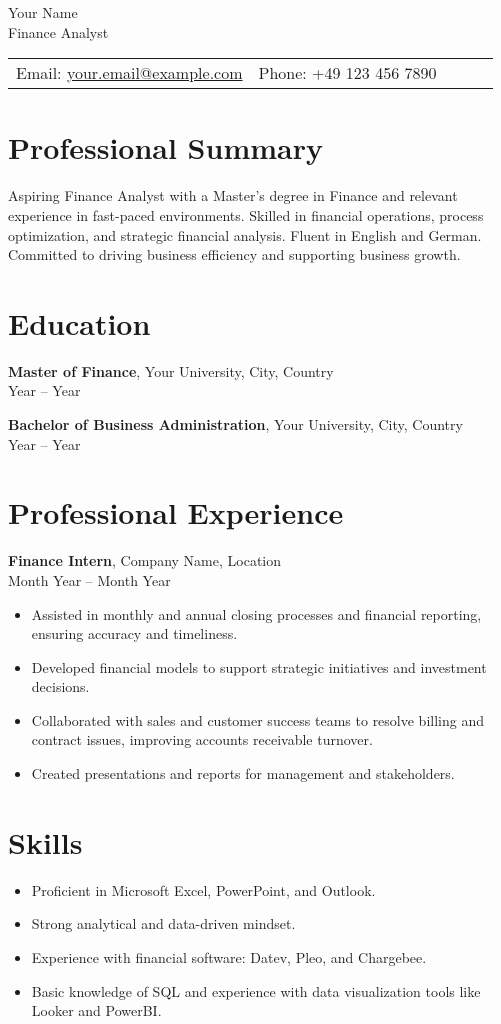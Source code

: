 \documentclass[a4paper,10pt]{article}
\newcommand{\contactinfo}[2]{
  \begin{tabular}{>{\centering\arraybackslash}m{0.5\linewidth}>{\centering\arraybackslash}m{0.5\linewidth}}
    Email: \href{mailto:#1}{#1} & Phone: #2 \\
  \end{tabular}
}
\begin{document}
\begin{center}
    \huge{Your Name} \\
    \large{Finance Analyst}
\end{center}

\contactinfo{your.email@example.com}{+49 123 456 7890}

\section*{Professional Summary}
Aspiring Finance Analyst with a Master's degree in Finance and relevant experience in fast-paced environments. Skilled in financial operations, process optimization, and strategic financial analysis. Fluent in English and German. Committed to driving business efficiency and supporting business growth.

\section*{Education}
\textbf{Master of Finance}, Your University, City, Country \\
Year -- Year

\textbf{Bachelor of Business Administration}, Your University, City, Country \\
Year -- Year

\section*{Professional Experience}

\textbf{Finance Intern}, Company Name, Location \\
Month Year -- Month Year
\begin{itemize}[leftmargin=*]
    \item Assisted in monthly and annual closing processes and financial reporting, ensuring accuracy and timeliness.
    \item Developed financial models to support strategic initiatives and investment decisions.
    \item Collaborated with sales and customer success teams to resolve billing and contract issues, improving accounts receivable turnover.
    \item Created presentations and reports for management and stakeholders.
\end{itemize}

\section*{Skills}
\begin{itemize}[leftmargin=*]
    \item Proficient in Microsoft Excel, PowerPoint, and Outlook.
    \item Strong analytical and data-driven mindset.
    \item Experience with financial software: Datev, Pleo, and Chargebee.
    \item Basic knowledge of SQL and experience with data visualization tools like Looker and PowerBI.
\end{itemize}
\end{document}
